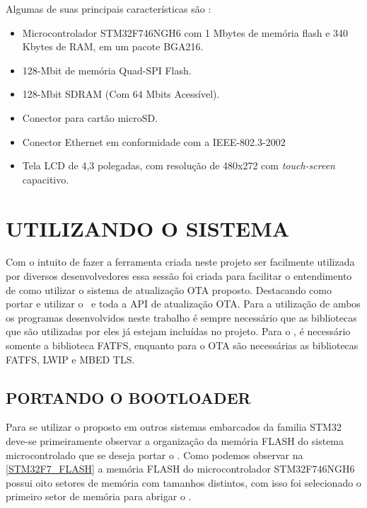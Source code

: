 Algumas de suas principais características são \cite{STM32F7}:
\begin{itemize}
    \item Microcontrolador STM32F746NGH6 com 1 Mbytes de memória flash e 340 Kbytes de RAM, em um pacote BGA216.
    \item 128-Mbit de memória Quad-SPI Flash.
    \item 128-Mbit SDRAM (Com 64 Mbits Acessível).
    \item Conector para cartão microSD.
    \item Conector Ethernet em conformidade com a IEEE-802.3-2002
    \item Tela LCD de 4,3 polegadas, com resolução de 480x272 com \textit{touch-screen} capacitivo.
    
\end{itemize}
\section{UTILIZANDO O SISTEMA}
Com o intuito de fazer a ferramenta criada neste projeto ser facilmente utilizada por diversos desenvolvedores essa sessão foi criada para facilitar o entendimento de como utilizar o sistema de atualização OTA proposto. Destacando como portar e utilizar o \bootloader\ e toda a API de atualização OTA. Para a utilização de ambos os programas desenvolvidos neste trabalho é sempre necessário que as bibliotecas que são utilizadas por eles já estejam incluídas no projeto. Para o \bootloader, é necessário somente a biblioteca FATFS, enquanto para o OTA são necessárias as bibliotecas FATFS, LWIP e MBED TLS.

\subsection{PORTANDO O BOOTLOADER}
Para se utilizar o \bootloader proposto em outros sistemas embarcados da familia STM32 deve-se primeiramente observar a organização da memória FLASH do sistema microcontrolado que se deseja portar o \bootloader. Como podemos observar na \autoref{STM32F7_FLASH} a memória FLASH do microcontrolador STM32F746NGH6 possui oito setores de memória com tamanhos distintos, com isso foi selecionado o primeiro setor de memória para abrigar o \bootloader.

